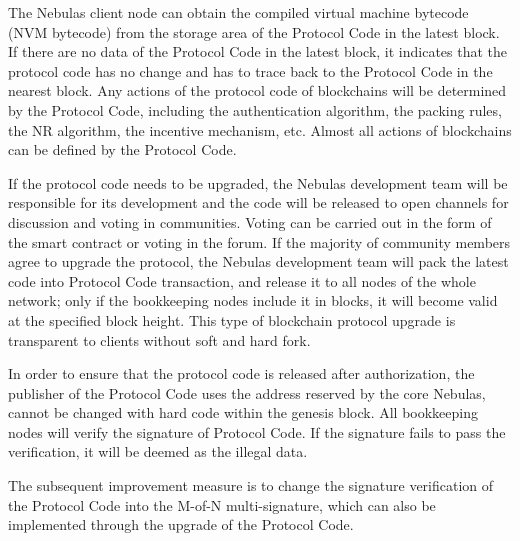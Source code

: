 The Nebulas client node can obtain the compiled virtual machine bytecode (NVM bytecode) from the storage area of the Protocol Code in the latest block. If there are no data of the Protocol Code in the latest block, it indicates that the protocol code has no change and has to trace back to the Protocol Code in the nearest block. Any actions of the protocol code of blockchains will be determined by the Protocol Code, including the authentication algorithm, the packing rules, the NR algorithm, the incentive mechanism, etc. Almost all actions of blockchains can be defined by the Protocol Code.

If the protocol code needs to be upgraded, the Nebulas development team will be responsible for its development and the code will be released to open channels for discussion and voting in communities. Voting can be carried out in the form of the smart contract or voting in the forum. If the majority of community members agree to upgrade the protocol, the Nebulas development team will pack the latest code into Protocol Code transaction, and release it to all nodes of the whole network; only if the bookkeeping nodes include it in blocks, it will become valid at the specified block height. This type of blockchain protocol upgrade is transparent to clients without soft and hard fork.



In order to ensure that the protocol code is released after authorization, the publisher of the Protocol Code uses the address reserved by the core Nebulas, cannot be changed with hard code within the genesis block. All bookkeeping nodes will verify the signature of Protocol Code. If the signature fails to pass the verification, it will be deemed as the illegal data.


The subsequent improvement measure is to change the signature verification of the Protocol Code into the M-of-N multi-signature, which can also be implemented through the upgrade of the Protocol Code.

